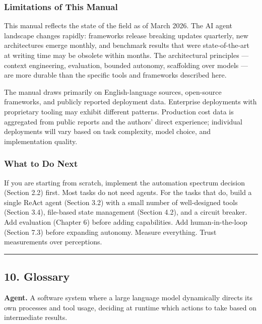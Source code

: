 \documentclass[11pt, a4paper]{article}
\begin{document}
\hypertarget{limitations-of-this-manual}{%
\subsubsection{Limitations of This
Manual}\label{limitations-of-this-manual}}

This manual reflects the state of the field as of March 2026. The AI
agent landscape changes rapidly: frameworks release breaking updates
quarterly, new architectures emerge monthly, and benchmark results that
were state-of-the-art at writing time may be obsolete within months. The
architectural principles --- context engineering, evaluation, bounded
autonomy, scaffolding over models --- are more durable than the specific
tools and frameworks described here.

The manual draws primarily on English-language sources, open-source
frameworks, and publicly reported deployment data. Enterprise
deployments with proprietary tooling may exhibit different patterns.
Production cost data is aggregated from public reports and the authors'
direct experience; individual deployments will vary based on task
complexity, model choice, and implementation quality.

\hypertarget{what-to-do-next}{%
\subsubsection{What to Do Next}\label{what-to-do-next}}

If you are starting from scratch, implement the automation spectrum
decision (Section 2.2) first. Most tasks do not need agents. For the
tasks that do, build a single ReAct agent (Section 3.2) with a small
number of well-designed tools (Section 3.4), file-based state management
(Section 4.2), and a circuit breaker. Add evaluation (Chapter 6) before
adding capabilities. Add human-in-the-loop (Section 7.3) before
expanding autonomy. Measure everything. Trust measurements over
perceptions.

\begin{center}\rule{0.5\linewidth}{0.5pt}\end{center}

\hypertarget{glossary}{%
\subsection{10. Glossary}\label{glossary}}

\textbf{Agent.} A software system where a large language model
dynamically directs its own processes and tool usage, deciding at
runtime which actions to take based on intermediate results.
\end{document}
